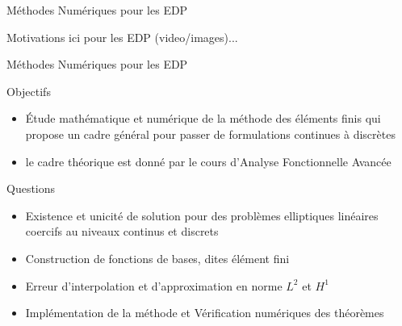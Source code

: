 \documentclass{beamer}
\begin{document}
\begin{frame}{M{\'e}thodes Num{\'e}riques pour les EDP}

Motivations ici pour les EDP (video/images)...

\end{frame}
\begin{frame}{M{\'e}thodes Num{\'e}riques pour les EDP}
  \begin{block}{Objectifs}
    \begin{itemize}
    \item {\'E}tude math{\'e}matique et num{\'e}rique de la m{\'e}thode des {\'e}l{\'e}ments
      finis qui propose un cadre g{\'e}n{\'e}ral pour passer de formulations
      continues {\`a} discr{\`e}tes
    \item le cadre th{\'e}orique est donn{\'e} par le cours d'Analyse
      Fonctionnelle Avanc{\'e}e
    \end{itemize}
  \end{block}
  \begin{block}{Questions}
    \begin{itemize}
    \item Existence et unicit{\'e} de solution pour des probl{\`e}mes
      elliptiques lin{\'e}aires coercifs au niveaux continus et discrets
    \item Construction de fonctions de bases, dites {\'e}l{\'e}ment fini
    \item Erreur d'interpolation et d'approximation en norme $L^2$ et $H^1$
    \item Impl{\'e}mentation de la m{\'e}thode et V{\'e}rification num{\'e}riques des th{\'e}or{\`e}mes
    \end{itemize}
  \end{block}
\end{frame}
\end{document}
